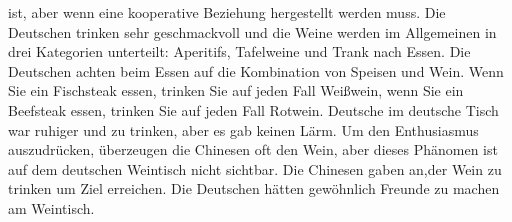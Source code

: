 ist, aber wenn eine kooperative Beziehung hergestellt werden muss. Die Deutschen trinken sehr  geschmackvoll und die Weine werden im Allgemeinen in drei Kategorien unterteilt: Aperitifs, Tafelweine und Trank nach Essen. Die Deutschen achten beim Essen auf die Kombination von Speisen und Wein. Wenn Sie ein Fischsteak essen, trinken Sie auf jeden Fall Wei\ss wein, wenn Sie ein Beefsteak essen, trinken Sie auf jeden Fall Rotwein. Deutsche im  deutsche Tisch war ruhiger und zu trinken, aber es gab keinen Lärm. Um den Enthusiasmus auszudrücken, überzeugen die Chinesen oft den Wein, aber dieses Phänomen ist auf dem deutschen Weintisch nicht sichtbar. Die Chinesen gaben an,der Wein zu trinken um Ziel erreichen. Die Deutschen hätten gewöhnlich Freunde zu machen am Weintisch.

